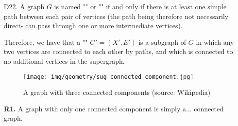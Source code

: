 {\begin{enumerate}
\begin{lemma}
	 In other words: If there is a path between two vertices $x$ and $y$, then there exists an elementary path between $x$ and $y$.
	 \end{lemma}
	 \begin{dem}
	 The idea of the proof is to choose a particular path between $x$ and $y$ and show that it is elementary. Which path to choose? If a path has a circuit, this circuit is a detour on the road of $x$ and $y$. A good candidate to be an elementary path appears to be a shortest path.
	 
	 Among all the paths connecting $x$ to $y$, let us choose a path:
	 
	 with the fewest possible edges. Suppose by contradiction that $P_k$ is not elementary. There exists in this path a vertices $z$ appearing at least two times along the path $P_k$.
	 
	 Given $i, j$ the first two indices such as $x_i=z$ and $x_j=z$:
	  
	 To get contradiction, we just delete the cycle between $x_i=z$ and $x_j=z$. So we have a new path:
	 
	 which is a path connecting $x$ to $y$. Its length strictly less than $P_k$: 
	  
	 which contradicts our initial choice as a shortest path.
	 \begin{flushright}
		$\blacksquare$  Q.E.D.
	\end{flushright}
	 \end{dem}
	 
	 \item[D22.] A graph $G$ is named "" or "" if and only if there is at least one simple path between each pair of vertices (the path being therefore not necessarily direct- can pass through one or more intermediate vertices).
	 
	 Therefore, we have that a "" $G'=(X',E')$ is a subgraph of $G$ in which any two vertices are connected to each other by paths, and which is connected to no additional vertices in the supergraph.
	 \begin{figure}[H]
		\centering
		\texttt{[image: img/geometry/sug\_connected\_component.jpg]}
		\caption[A graph with three connected components]{A graph with three connected components (source: Wikipedia)}
	\end{figure}
	\begin{tcolorbox}[title=Remarks,colframe=black,arc=10pt]
	\textbf{R1.} A graph with only one connected component is simply a... connected graph. \\
	

\end{tcolorbox}
\end{enumerate}}
